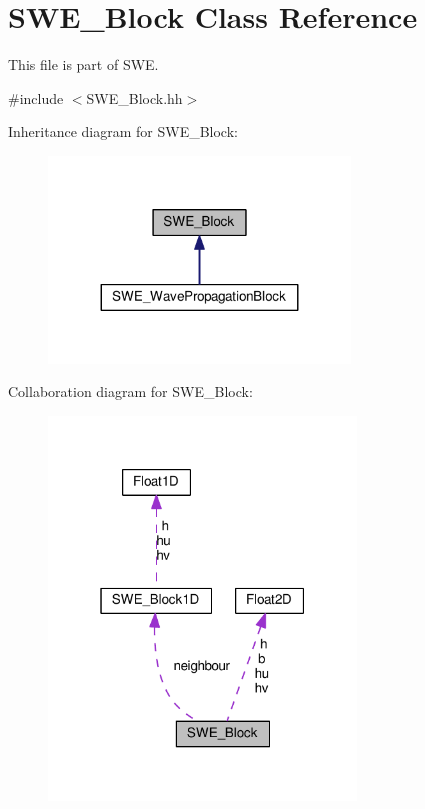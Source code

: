 \hypertarget{classSWE__Block}{}\section{S\+W\+E\+\_\+\+Block Class Reference}
\label{classSWE__Block}


This file is part of S\+WE.  




{\ttfamily \#include $<$S\+W\+E\+\_\+\+Block.\+hh$>$}



Inheritance diagram for S\+W\+E\+\_\+\+Block\+:\nopagebreak
\begin{figure}[H]
\begin{center}
\leavevmode
\includegraphics[width=227pt]{classSWE__Block__inherit__graph}
\end{center}
\end{figure}


Collaboration diagram for S\+W\+E\+\_\+\+Block\+:\nopagebreak
\begin{figure}[H]
\begin{center}
\leavevmode
\includegraphics[width=232pt]{classSWE__Block__coll__graph}
\end{center}
\end{figure}
